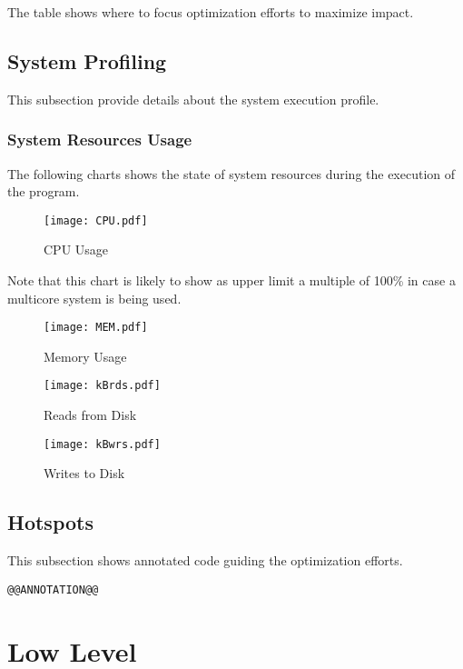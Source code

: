 \documentclass[a4paper]{article}
\begin{document}
The table shows where to focus optimization efforts to maximize impact.

\subsection{System Profiling}

This subsection provide details about the system execution profile.

\subsubsection{System Resources Usage}

The following charts shows the state of system resources during the execution of the program.

\begin{figure}[H]
\label{fig:cpu}
\centering
\texttt{[image: CPU.pdf]}
\caption{CPU Usage}
\end{figure}

Note that this chart is likely to show as upper limit a multiple of 100\% in case a multicore system is being used.

\begin{figure}[H]
\label{fig:memory}
\centering
\texttt{[image: MEM.pdf]}
\caption{Memory Usage}
\end{figure}

\begin{figure}[H]
\label{fig:reads}
\centering
\texttt{[image: kBrds.pdf]}
\caption{Reads from Disk}
\end{figure}

\begin{figure}[H]
\label{fig:writes}
\centering
\texttt{[image: kBwrs.pdf]}
\caption{Writes to Disk}
\end{figure}

\subsection{Hotspots}

This subsection shows annotated code guiding the optimization efforts.

\begin{verbatim}
@@ANNOTATION@@
\end{verbatim}

\section{Low Level}
\end{document}
